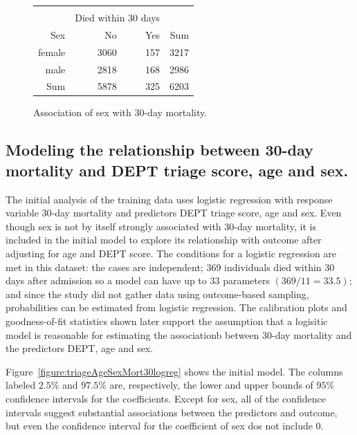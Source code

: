 \begin{figure}[ht]
\centering
\begin{tabular}{rrrr}
  \hline \\
    & \multicolumn{2}{c}{Died within 30 days} & \\
 Sex & No & Yes & Sum \\
  \hline
female & 3060 & 157 & 3217 \\
  male & 2818 & 168 & 2986 \\
  Sum & 5878 & 325 & 6203 \\
   \hline
\end{tabular}
\caption{Association of sex with
       30-day mortality.}
\label{figure:sexMort30Table}
\end{figure}

\subsection{Modeling the relationship between 30-day mortality and DEPT triage score, age and sex.}
\label{section:triageModelDEPTAgeSex}

The initial analysis of the training data uses logistic regression with response variable 30-day mortality and predictors DEPT triage score, age and sex.  Even though sex is not by itself strongly associated with 30-day mortality, it is included in the initial model to explore its relationship with outcome after adjusting for age and DEPT score.   The conditions for a logistic regression are met in this dataset: the cases are independent; 369 individuals died within 30 days after admission so a model can have up to 33 parameters $(369/11 = 33.5)$; and since the study did not gather data using outcome-based sampling, probabilities can be estimated from logistic regression.  The calibration plots and goodness-of-fit statistics shown later support the assumption that a logisitic model is reasonable for estimating the associationb between 30-day mortality and the predictors DEPT, age and sex.

Figure~\ref{figure:triageAgeSexMort30logreg} shows the initial model. The columns labeled $2.5\%$ and $97.5\%$ are, respectively, the lower and upper bounds of $95\%$ confidence intervals for the coefficients. Except for sex, all of the confidence intervals suggest substantial associations between the predictors and outcome, but even the confidence interval for the coefficient of sex dos not include 0. 


